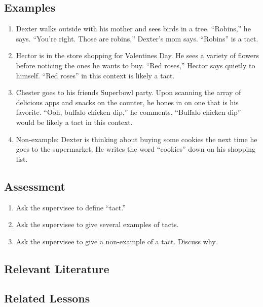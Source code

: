 \subsection{Examples}
\begin{enumerate}
\item Dexter walks outside with his mother and sees birds in a tree.  ``Robins,'' he says.  ``You're right. Those are robins,'' Dexter's mom says. ``Robins'' is a tact.
\item Hector is in the store shopping for Valentines Day.  He sees a variety of flowers before noticing the ones he wants to buy.  ``Red roses,'' Hector says quietly to himself. ``Red roses'' in this context is likely a tact. 
\item Chester goes to his friends Superbowl party.  Upon scanning the array of delicious apps and snacks on the counter, he hones in on one that is his favorite.  ``Ooh, buffalo chicken dip,'' he comments.  ``Buffalo chicken dip'' would be likely a tact in this context.
\item Non-example: Dexter is thinking about buying some cookies the next time he goes to the supermarket.  He writes the word ``cookies'' down on his shopping list. 
%
\end{enumerate}
%
\subsection{Assessment}
\begin{enumerate}
\item Ask the supervisee to define ``tact.''  
\item Ask the supervisee to give several examples of tacts.
\item Ask the supervisee to give a non-example of a tact. Discuss why.
%
\end{enumerate}
%
\subsection{Relevant Literature}
\begin{refsection}
\nocite{cooper2007applied,
        skinner1957verbal}
\printbibliography[heading=none]
\end{refsection}
%
\subsection{Related Lessons}
\fourdTwelve{}\\
%
